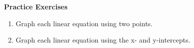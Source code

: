\textbf{Practice Exercises}

\vspce

\begin{enumerate}[label = \Alph*. ]
\item \hspce Graph each linear equation using two points. 
\begin{enumerate}[label = \arabic*. ]
\end{enumerate}  

\vspce 
\item \hspce Graph each linear equation using the x- and  y-intercepts.  
\begin{enumerate}[label = \arabic*. ]
\end{enumerate}  

\end{enumerate}  